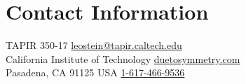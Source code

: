 \section{\sc Contact Information}
TAPIR 350-17      \hfill \href{mailto:leostein@tapir.caltech.edu}{leostein@tapir.caltech.edu}\\
California Institute of Technology   \hfill \href{https://duetosymmetry.com/}{duetosymmetry.com}\\
Pasadena, CA 91125 USA \hfill \href{tel:1-617-466-9536}{1-617-466-9536}


